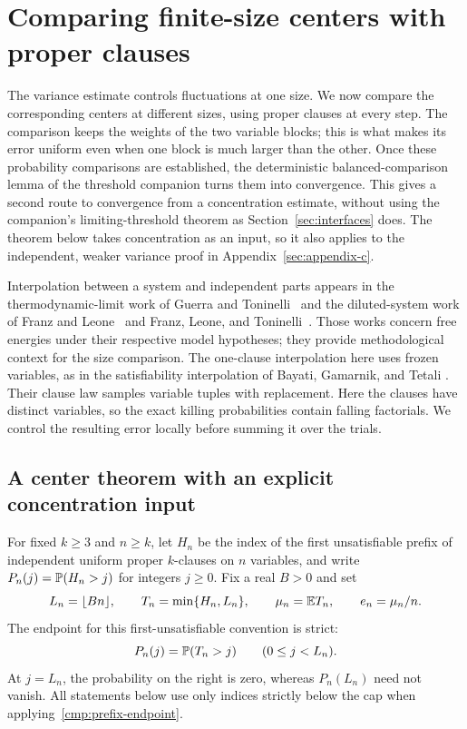 \section{Comparing finite-size centers with proper clauses}
\label{sec:direct-comparison}

The variance estimate controls fluctuations at one size.  We now compare
the corresponding centers at different sizes, using proper clauses at
every step.  The comparison keeps the weights of the two variable blocks;
this is what makes its error uniform even when one block is much larger
than the other.  Once these probability comparisons are established, the
deterministic balanced-comparison lemma of the threshold companion turns
them into convergence. This gives a second route to convergence from a
concentration estimate, without using the companion's limiting-threshold
theorem as Section~\ref{sec:interfaces} does. The theorem below takes
concentration as an input, so it also applies to the independent,
weaker variance proof in Appendix~\ref{sec:appendix-c}.

Interpolation between a system and independent parts appears in the
thermodynamic-limit work of Guerra and Toninelli~\cite{GuerraToninelli}
and the diluted-system work of Franz and Leone~\cite{FranzLeone} and
Franz, Leone, and Toninelli~\cite{FranzLeoneToninelli}.
Those works concern free energies under their respective model
hypotheses; they provide methodological context for the size comparison.
The one-clause interpolation here uses frozen variables, as in the
satisfiability interpolation of Bayati, Gamarnik, and Tetali
\cite[Section~4, Proposition~2]{BGT}.  Their clause law samples variable
tuples with replacement.  Here the clauses have distinct variables, so
the exact killing probabilities contain falling factorials.
We control the resulting error locally before summing it over the trials.

\subsection{A center theorem with an explicit concentration input}

For fixed $k\ge3$ and $n\ge k$, let $H_n$ be the index of the first
unsatisfiable prefix of independent uniform proper $k$-clauses on $n$
variables, and write $P_n(j)=\mathbb P(H_n>j)$ for integers $j\ge0$.
Fix a real $B>0$ and set
\[
 L_n=\lfloor Bn\rfloor,\qquad T_n=\min\{H_n,L_n\},\qquad
 \mu_n=\mathbb E T_n,\qquad e_n=\mu_n/n.
\]
The endpoint for this first-unsatisfiable convention is strict:
\begin{equation}\label{cmp:prefix-endpoint}
 P_n(j)=\mathbb P(T_n>j)\qquad(0\le j<L_n).
\end{equation}
At $j=L_n$, the probability on the right is zero, whereas $P_n(L_n)$
need not vanish.  All statements below use only indices strictly below
the cap when applying~\eqref{cmp:prefix-endpoint}.

